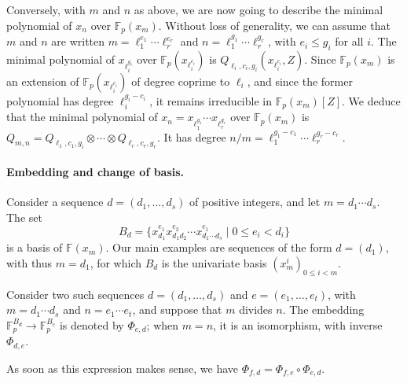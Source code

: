 \documentclass{sig-alternate}
\def\F {\ensuremath{\mathbb{F}}}
\begin{document}
Conversely, with $m$ and $n$ as above, we are now going to describe
the minimal polynomial of $x_n$ over $\F_p(x_m)$. Without loss of
generality, we can assume that $m$ and $n$ are written
$m=\ell_1^{e_1}\cdots \ell_r^{e_r}$ and
$n=\ell_1^{g_1}\cdots\ell_r^{g_r}$, with $e_i \le g_i$ for all $i$.
The minimal polynomial of $x_{\ell_i^{g_i}}$ over
$\F_p(x_{\ell_i^{c_i}})$ is $Q_{\ell_i,c_i,g_i}(x_{\ell_i^{c_i}},Z)$.
Since $\F_p(x_m)$ is an extension of $\F_p(x_{\ell_i^{c_i}})$ of
degree coprime to $\ell_i$, and since the former polynomial has degree
$\ell_i^{g_i-c_i}$, it remains irreducible in $\F_p(x_m)[Z]$. We
deduce that the minimal polynomial of $x_n = x_{\ell_1^{g_1}}\cdots
x_{\ell_r^{g_r}}$ over $\F_p(x_m)$ is $Q_{m,n}=Q_{\ell_1,c_1,g_i}
\otimes \cdots \otimes Q_{\ell_r,c_r,g_r}.$ It has degree
$n/m=\ell_1^{g_1-c_1}\cdots \ell_r^{g_r-c_r}$.

\paragraph{Embedding and change of basis.} Consider a sequence $d=(d_1,\dots,d_s)$ 
of positive integers, and let $m=d_1 \cdots d_s$. The set
$$B_d = \{ x_{d_1}^{e_1} x_{d_1 d_2}^{e_2} \cdots x_{d_1 \cdots
  d_s}^{e_1} \mid 0 \le e_i < d_i \}$$ is a basis of $\F(x_m)$. Our
main examples are sequences of the form $d=(d_1)$, with thus $m=d_1$,
for which $B_d$ is the univariate basis $(x_m^i)_{0 \le i < m}$.

Consider two such sequences $d=(d_1,\dots,d_s)$ and
$e=(e_1,\dots,e_t)$, with $m=d_1 \cdots d_s$ and $n=e_1 \cdots e_t$,
and suppose that $m$ divides $n$. The embedding $\F_p^{B_d} \to
\F_p^{B_e}$ is denoted by $\Phi_{e,d}$; when $m=n$, it is an
isomorphism, with inverse $\Phi_{d,e}$.

As soon as this expression makes sense, we have $\Phi_{f,d} =
\Phi_{f,e}\circ \Phi_{e,d}$.
\end{document}
